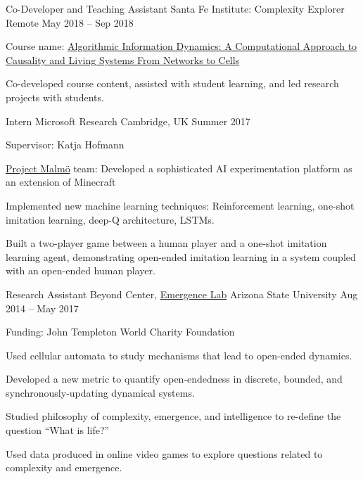 \begin{cventries}
\cventry
    {Co-Developer and Teaching Assistant}
    {Santa Fe Institute: Complexity Explorer}
    {Remote}
    {May 2018 -- Sep 2018}
    {
    \begin{cvitems}
       \item {Course name: \href{https://www.complexityexplorer.org/courses/63-algorithmic-information-dynamics-a-computational-approach-to-causality-and-living-systems-from-networks-to-cells}{Algorithmic Information Dynamics: A Computational Approach to Causality and Living Systems From Networks to Cells}}
       \item {Co-developed course content, assisted with student learning, and led research projects with students.}
    \end{cvitems}
    }

\cventry
    {Intern}
    {Microsoft Research}
    {Cambridge, UK}
    {Summer 2017}
    {
    \begin{cvitems}
       \item {Supervisor: Katja Hofmann}
       \item {\href{https://www.microsoft.com/en-us/research/project/project-malmo/}{Project Malm\"{o}} team: Developed a sophisticated AI experimentation platform as an extension of Minecraft}
       \item {Implemented new machine learning techniques: Reinforcement learning, one-shot imitation learning, deep-Q architecture, LSTMs.}
       \item {Built a two-player game between a human player and a one-shot imitation learning agent, demonstrating open-ended imitation learning in a system coupled with an open-ended human player.}
    \end{cvitems}
    }

\cventry
    {Research Assistant}
    {Beyond Center, \href{http://emergence.asu.edu/}{Emergence Lab}}
    {Arizona State University}
    {Aug 2014 -- May 2017}
    {
    \begin{cvitems}
        \item {Funding: John Templeton World Charity Foundation}
        \item {Used cellular automata to study mechanisms that lead to open-ended dynamics.}
        \item {Developed a new metric to quantify open-endedness in discrete, bounded, and synchronously-updating dynamical systems.}
        \item {Studied philosophy of complexity, emergence, and intelligence to re-define the question ``What is life?''}
        \item {Used data produced in online video games to explore questions related to complexity and emergence.}
    \end{cvitems}
    }


\end{cventries}
